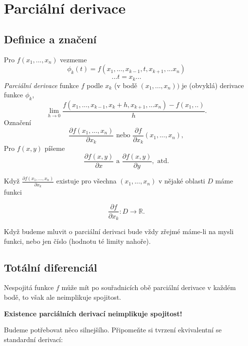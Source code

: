 \documentclass[../main.tex]{subfiles}
\begin{document}
\section{Parciální derivace}

\subsection{Definice a značení}
\hspace{1.2mm}
Pro $f(x_1,...,x_n)$ vezmeme 
\[\phi_k(t) = f(x_1,...,x_{k-1},t,x_{k+1},...x_n)\]
\[... t = x_k...\]
\hspace{1.2mm}
\textit{Parciální derivace} funkce $f$ podle $x_k$ (v bodě $(x_1,...,x_n))$ je (obvyklá) derivace funkce $\phi_k$,
\[\lim_{h\rightarrow 0}\frac{f(x_1,...,x_{k-1},x_k+h,x_{k+1},...x_n) - f(x_1,..)}{h}.\]
\hspace{1.2mm}
Označení
\[\frac{\partial f(x_1,...,x_n)}{\partial x_k} \textrm{ nebo } \frac{\partial f}{\partial x_k} (x_1,...,x_n),\]
\hspace{1.2mm}
Pro $f(x,y)$ píšeme
\[\frac{\partial f(x,y)}{\partial x} \textrm{ a } \frac{\partial f(x,y)}{\partial y}, \textrm{ atd.}\]

\noindent
\hspace{1.2mm}
Když $\frac{\partial f(x_1,...,x_n)}{\partial x_k}$ existuje pro všechna $(x_1,...,x_n)$ v nějaké oblasti $D$ máme funkci

\[\frac{\partial f}{\partial x_k}: D \rightarrow \mathbb{R}.\]

\noindent
\hspace{1.2mm}
Když budeme mluvit o parciální derivaci bude vždy zřejmé máme-li na mysli funkci, nebo jen číslo (hodnotu té limity nahoře).
\noindent

\subsection{Totální diferenciál}
\hspace{1.2mm}
Nespojitá funkce $f$ může mít po souřadnicích obě parciální derivace v každém bodě, to však ale neimplikuje spojitost.
\begin{center}
    \textbf{Existence parciálních derivací neimplikuje spojitost!}
\end{center}
\hspace{1.2mm}
Budeme potřebovat něco silnejšího. Připomeňte si tvrzení ekvivalentní se standardní derivací:
\end{document}
